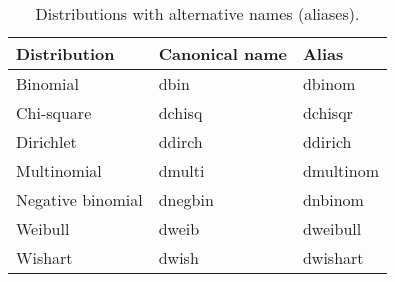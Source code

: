 
\begin{table}[!h]
  \begin{center}
    \begin{tabular}{lll}
      \hline
      Distribution & Canonical name & Alias \\
      \hline
     Binomial & dbin & dbinom \\
     Chi-square & dchisq & dchisqr \\     
Dirichlet & ddirch & ddirich \\
Multinomial & dmulti & dmultinom \\
Negative binomial & dnegbin & dnbinom  \\
    Weibull & dweib & dweibull \\ 
    Wishart & dwish & dwishart
     \hline
    \end{tabular}
  \caption{Distributions with alternative names (aliases).}
    \label{table:distributions-aliases}
  \end{center}
\end{table}

\newpage